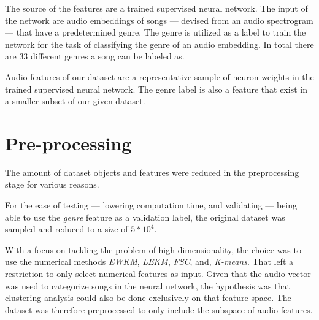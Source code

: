 \documentclass[../report.tex]{subfiles}
\begin{document}
The source of the features are a trained supervised neural network. The input of the network are audio embeddings of songs --- devised from an audio spectrogram --- that have a predetermined genre. The genre is utilized as a label to train the network for the task of classifying the genre of an audio embedding. In total there are $33$ different genres a song can be labeled as.

Audio features of our dataset are a representative sample of neuron weights in the trained supervised neural network. The genre label is also a feature that exist in a smaller subset of our given dataset.



\section{Pre-processing}
The amount of dataset objects and features were reduced in the preprocessing stage for various reasons.

For the ease of testing --- lowering computation time, and validating --- being able to use the \textit{genre} feature as a validation label, the original dataset was sampled and reduced to a size of $5*10^4$.

With a focus on tackling the problem of high-dimensionality, the choice was to use the numerical methods \textit{EWKM}, \textit{LEKM}, \textit{FSC}, and, \textit{K-means}. That left a restriction to only select numerical features as input. Given that the audio vector was used to categorize songs in the neural network, the hypothesis was that clustering analysis could also be done exclusively on that feature-space. The dataset was therefore preprocessed to only include the subspace of audio-features.
\end{document}
